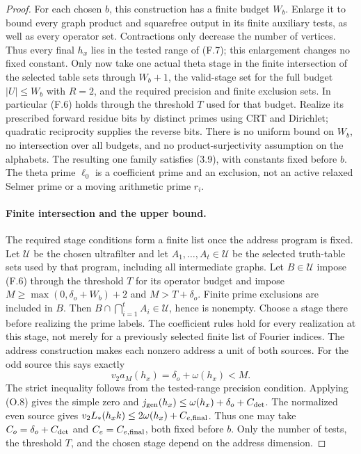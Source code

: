 \documentclass[11pt]{article}
\theoremstyle{definition}
\theoremstyle{remark}
\begin{document}
\begin{proof}\leavevmode
For each chosen $b$, this construction has a finite budget $W_b$.
Enlarge it to bound every graph product and squarefree output in its
finite auxiliary tests, as well as every operator set. Contractions
only decrease the number of vertices. Thus every final $h_x$ lies in
the tested range of (F.7); this enlargement changes no fixed constant.
Only now take one actual theta stage in the finite intersection
of the selected table sets through $W_b+1$, the valid-stage set
for the full budget $|U|\le W_b$ with $R=2$, and the required
precision and finite exclusion sets.  In particular (F.6) holds
through the threshold $T$ used for that budget.
Realize its prescribed forward residue bits by distinct primes using CRT and Dirichlet;
quadratic reciprocity supplies the reverse bits.
There is no uniform bound on $W_b$, no intersection over all
budgets, and no product-surjectivity assumption on the alphabets.
The resulting one family satisfies (3.9), with constants fixed
before $b$. The theta prime $\ell_0$ is a coefficient prime and
an exclusion, not an active relaxed Selmer prime or a moving
arithmetic prime $r_i$.
\paragraph{Finite intersection and the upper bound.}
The required stage conditions form a finite list once the address
program is fixed. Let $\mathcal U$ be the chosen ultrafilter and
let $A_1,\ldots,A_t\in\mathcal U$ be the selected truth-table
sets used by that program, including all intermediate graphs.
Let $B\in\mathcal U$ impose (F.6) through the threshold $T$
for its operator budget and impose
$M\ge\max(0,\delta_o+W_b)+2$ and $M>T+\delta_o$.
Finite prime exclusions are included in $B$.
Then $B\cap\bigcap_{i=1}^t A_i\in\mathcal U$, hence is nonempty.
Choose a stage there before realizing the prime labels. The
coefficient rules hold for every realization at this stage, not
merely for a previously selected finite list of Fourier indices.
The address construction makes each nonzero address a unit of
both sources. For the odd source this says exactly
\[
 v_2a_M(h_x)=\delta_o+\omega(h_x)<M.
\]
The strict inequality follows from the tested-range precision
condition. Applying (O.8) gives the simple zero and
$j_{\rm gen}(h_x)\le\omega(h_x)+\delta_o+C_{\rm det}$.
The normalized even source gives
$v_2L_*(h_xk)\le2\omega(h_x)+C_{e,\rm final}$.
Thus one may take $C_o=\delta_o+C_{\rm det}$ and
$C_e=C_{e,\rm final}$, both fixed before $b$. Only the number
of tests, the threshold $T$, and the chosen stage depend on the
address dimension.
\end{proof}
\end{document}
